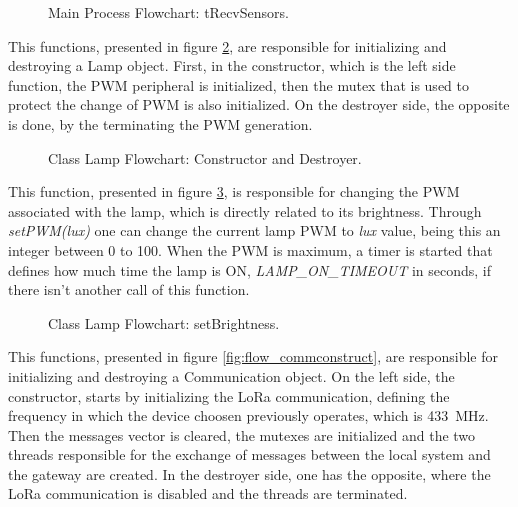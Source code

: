 \begin{figure}[H]
	\centering	
	\caption{Main Process Flowchart: tRecvSensors.}
	\label{fig:flow_trecv_sensors}
\end{figure}

\clearpage
{}

This functions, presented in figure \ref{fig:flow_lampconstruct}, are responsible for initializing and destroying a Lamp object. First, in the constructor, which is the left side function, the PWM peripheral is initialized, then the mutex that is used to protect the change of PWM is also initialized. On the destroyer side, the opposite is done, by the terminating the PWM generation.

\begin{figure}[H]
	\centering	
	\caption{Class Lamp Flowchart: Constructor and Destroyer.}
	\label{fig:flow_lampconstruct}
\end{figure}


This function, presented in figure \ref{fig:flow_setbrightness}, is responsible for changing the PWM associated with the lamp, which is directly related to its brightness. Through \textit{setPWM(lux)} one can change the current lamp PWM to \textit{lux} value, being this an integer between 0 to 100. When the PWM is maximum, a timer is started that defines how much time the lamp is ON, \textit{LAMP\_ON\_TIMEOUT} in seconds, if there isn't another call of this function.

\begin{figure}[H]
	\centering	
	\caption{Class Lamp Flowchart: setBrightness.}
	\label{fig:flow_setbrightness}
\end{figure}


\clearpage
{}

This functions, presented in figure \ref{fig:flow_commconstruct}, are responsible for initializing and destroying a Communication object. On the left side, the constructor, starts by initializing the LoRa communication, defining the frequency in which the device choosen previously operates, which is 433~MHz. Then the messages vector is cleared, the mutexes are initialized and the two threads responsible for the exchange of messages between the local system and the gateway are created. In the destroyer side, one has the opposite, where the LoRa communication is disabled and the threads are terminated.

